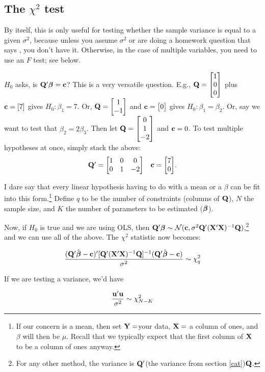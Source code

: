 \subsection{The $\chi^2$ test}

By itself, this is only useful for testing whether the sample variance
is equal to a given $\sigma^2$, because unless you assume $\sigma^2$ 
or are doing a homework question that says , you don't have it. Otherwise, in the case of multiple variables, you need to use
an $F$ test; see below.

$H_0$ asks, is ${{\bf Q}'
{\mbox{\boldmath$\beta$}}} = {\bf c}$?  This is a very versatile question. E.g., ${\bf Q} =
\left[\begin{matrix}1\cr 0\cr 0\end{matrix}\right]$ plus ${\bf c} = [7]$ gives $H_0: \beta_1 = 7$. Or, ${\bf Q} = \left[\begin{matrix}1 \cr
-1\end{matrix}\right]$ and ${\bf c} = \left[\begin{matrix}0\end{matrix}\right]$ gives $H_0: \beta_1=\beta_2$. 
Or, say we want to test that $\beta_2 = 2\beta_3$. Then let ${\bf Q}=\left[\begin{matrix}0 \cr 1 \cr -2\end{matrix}\right]$ and ${\bf c} = 0$.
To test multiple hypotheses at once, simply stack the above:
\begin{equation}
\begin{matrix}{\bf Q}' = \left[\begin{matrix}1 & 0 & 0  \cr
                0 &1 &-2\end{matrix}\right] 
                & {\bf c} = \left[\begin{matrix}7 \cr 0\end{matrix}\right]\end{matrix}.\label{qc}\end{equation}

I dare
say that every linear hypothesis having to do with a mean or a $\beta$ can be
fit into this form.\footnote{If our concern is a mean, then set
${\bf Y}=$your data, ${\bf X}=$ a column of ones, and $\beta$ will then be
$\mu$. Recall that we typically expect that the first column of ${\bf X}$ to
be a column of ones anyway.}
Define $q$ to be the number of constraints (columns
of ${\bf Q}$), $N$ the sample size, and $K$ the number of parameters to be
estimated (${\mbox{\boldmath$\beta$}}$).

Now, if $H_0$ is true and we are using OLS, then ${\bf Q}' {\mbox{\boldmath$\beta$}} \sim {\cal
N}({\bf c}, \sigma^2 {\bf Q}' ({\bf X}'{\bf X})^{-1} {\bf Q})$,\footnote{For any other
method, the variance is ${\bf Q}'$(the variance from section
\ref{cat})${\bf Q}$.} and we can use all of the above. The $\chi^2$
statistic now becomes:

\begin{equation}		\label{chi1}
{({\bf Q}'\hat{{\mbox{\boldmath$\beta$}}}- {\bf c})' [{\bf Q}' ({\bf X}'{\bf X})^{-1} {\bf Q}]^{-1} ({\bf Q}' \hat{{\mbox{\boldmath$\beta$}}}- {\bf c})
\over \sigma^2} \sim \chi^2_q
\end{equation}

If we are testing a variance, we'd have 

\begin{equation}		\label{chi2}
{{\bf u}' {\bf u} \over \sigma^2} \sim \chi^2_{N-K}
\end{equation}


